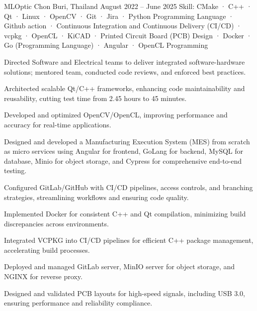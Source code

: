 \begin{cventries}
    {MLOptic} %
    {Chon Buri, Thailand} %
    {August 2022 -- June 2025} %
    {Skill: CMake · C++ · Qt · Linux · OpenCV · Git · Jira · Python Programming Language · Github action · Continuous Integration and Continuous Delivery (CI/CD) · vcpkg · OpenCL · KiCAD · Printed Circuit Board (PCB) Design · Docker · Go (Programming Language) · Angular · OpenCL Programming} %
    {
      \begin{cvitems} %
      \item {Directed Software and Electrical teams to deliver integrated software-hardware solutions; mentored team, conducted code reviews, and enforced best practices.}
      \item { Architected scalable Qt/C++ frameworks, enhancing code maintainability and reusability, cutting test time from 2.45 hours to 45 minutes.}
      \item { Developed and optimized OpenCV/OpenCL, improving performance and accuracy for real-time applications.}
      \item { Designed and developed a Manufacturing Execution System (MES) from scratch as micro services using Angular for frontend, GoLang for backend, MySQL for database, Minio for object storage, and Cypress for comprehensive end-to-end testing.}
      \item { Configured GitLab/GitHub with CI/CD pipelines, access controls, and branching strategies, streamlining workflows and ensuring code quality.}
      \item { Implemented Docker for consistent C++ and Qt compilation, minimizing build discrepancies across environments.}
      \item { Integrated VCPKG into CI/CD pipelines for efficient C++ package management, accelerating build processes.}
      \item { Deployed and managed GitLab server, MinIO server for object storage, and NGINX for reverse proxy.}
      \item { Designed and validated PCB layouts for high-speed signals, including USB 3.0, ensuring performance and reliability compliance.}

\end{cvitems}}
\end{cventries}
